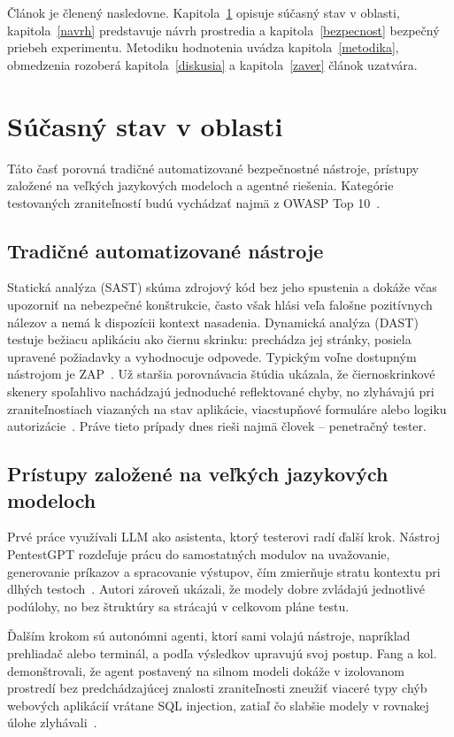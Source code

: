 \documentclass[10pt,twoside,slovak,a4paper]{article}
\begin{document}
Článok je členený nasledovne. Kapitola~\ref{sucasny-stav} opisuje súčasný stav v oblasti, kapitola~\ref{navrh} predstavuje návrh prostredia a kapitola~\ref{bezpecnost} bezpečný priebeh experimentu. Metodiku hodnotenia uvádza kapitola~\ref{metodika}, obmedzenia rozoberá kapitola~\ref{diskusia} a kapitola~\ref{zaver} článok uzatvára.

\section{Súčasný stav v oblasti}\label{sucasny-stav}
Táto časť porovná tradičné automatizované bezpečnostné nástroje, prístupy založené na veľkých jazykových modeloch a agentné riešenia. Kategórie testovaných zraniteľností budú vychádzať najmä z OWASP Top 10~\cite{OWASP-Top10}.

\subsection{Tradičné automatizované nástroje}\label{tradicne}
Statická analýza (SAST) skúma zdrojový kód bez jeho spustenia a dokáže včas upozorniť na nebezpečné konštrukcie, často však hlási veľa falošne pozitívnych nálezov a nemá k dispozícii kontext nasadenia. Dynamická analýza (DAST) testuje bežiacu aplikáciu ako čiernu skrinku: prechádza jej stránky, posiela upravené požiadavky a vyhodnocuje odpovede. Typickým voľne dostupným nástrojom je ZAP~\cite{ZAP}. Už staršia porovnávacia štúdia ukázala, že čiernoskrinkové skenery spoľahlivo nachádzajú jednoduché reflektované chyby, no zlyhávajú pri zraniteľnostiach viazaných na stav aplikácie, viacstupňové formuláre alebo logiku autorizácie~\cite{Doupe-Johnny}. Práve tieto prípady dnes rieši najmä človek -- penetračný tester.

\subsection{Prístupy založené na veľkých jazykových modeloch}\label{llm}
Prvé práce využívali LLM ako asistenta, ktorý testerovi radí ďalší krok. Nástroj PentestGPT rozdeľuje prácu do samostatných modulov na uvažovanie, generovanie príkazov a spracovanie výstupov, čím zmierňuje stratu kontextu pri dlhých testoch~\cite{Deng-PentestGPT}. Autori zároveň ukázali, že modely dobre zvládajú jednotlivé podúlohy, no bez štruktúry sa strácajú v celkovom pláne testu.

Ďalším krokom sú autonómni agenti, ktorí sami volajú nástroje, napríklad prehliadač alebo terminál, a podľa výsledkov upravujú svoj postup. Fang a kol. demonštrovali, že agent postavený na silnom modeli dokáže v izolovanom prostredí bez predchádzajúcej znalosti zraniteľnosti zneužiť viaceré typy chýb webových aplikácií vrátane SQL injection, zatiaľ čo slabšie modely v rovnakej úlohe zlyhávali~\cite{Fang-HackWebsites}.
\end{document}
